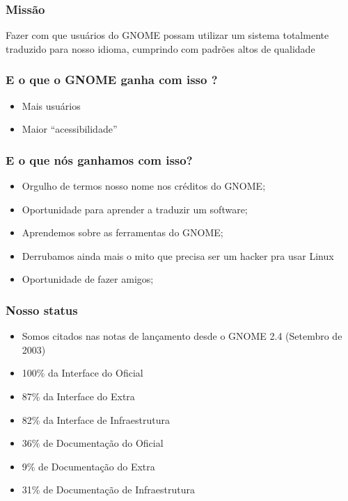 \documentclass{beamer}
\begin{document}
\begin{frame}
    \frametitle{Missão}
    Fazer com que usuários do GNOME possam utilizar um sistema 
    totalmente traduzido para nosso idioma, cumprindo 
    com padrões altos de qualidade 
\end{frame}

\begin{frame}
  \frametitle{E o que o GNOME ganha com isso ?}
  \begin{itemize}
    \item Mais usuários
    \item Maior ``acessibilidade''
  \end{itemize}  
\end{frame}

\begin{frame}
  \frametitle{E o que nós ganhamos com isso?}
  \begin{itemize}
    \item Orgulho de termos nosso nome nos créditos do GNOME;
    \item Oportunidade para aprender a traduzir um software;
    \item Aprendemos sobre as ferramentas do GNOME;
    \item Derrubamos ainda mais o mito que precisa ser um hacker pra usar Linux
    \item Oportunidade de fazer amigos;
  \end{itemize}
\end{frame}
\begin{frame}
    \frametitle[Para o GNOME 2.28]{Nosso status}    
    \begin{itemize}[<+->]
        \item \color[rgb]{0,1,0} Somos citados nas notas de lançamento desde o GNOME 2.4 (Setembro de 2003)  
        \item \color[rgb]{0,1,0} 100\% da Interface do Oficial 
        \item \color[rgb]{0,1,0} 87\% da Interface do Extra
        \item \color[rgb]{0,1,0} 82\% da Interface de Infraestrutura
        \item \color[rgb]{1,0,0} 36\% de Documentação do Oficial
        \item \color[rgb]{1,0,0} 9\%  de Documentação do Extra
        \item \color[rgb]{1,0,0} 31\% de Documentação de Infraestrutura
    \end{itemize}
\end{frame}
\end{document}
